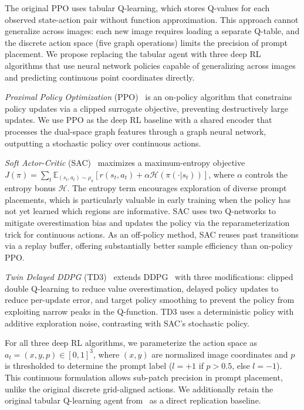 \documentclass[journal, onecolumn]{IEEEtran}
\begin{document}
The original PPO uses tabular Q-learning, which stores Q-values for each observed state-action pair without function approximation. This approach cannot generalize across images: each new image requires loading a separate Q-table, and the discrete action space (five graph operations) limits the precision of prompt placement. We propose replacing the tabular agent with three deep RL algorithms that use neural network policies capable of generalizing across images and predicting continuous point coordinates directly.

\textit{Proximal Policy Optimization} (PPO)~\cite{Schulman2017PPO} is an on-policy algorithm that constrains policy updates via a clipped surrogate objective, preventing destructively large updates. We use PPO as the deep RL baseline with a shared encoder that processes the dual-space graph features through a graph neural network, outputting a stochastic policy over continuous actions.

\textit{Soft Actor-Critic} (SAC)~\cite{Haarnoja2018SAC} maximizes a maximum-entropy objective $J(\pi) = \sum_t \mathbb{E}_{(s_t, a_t) \sim \rho_\pi}\left[r(s_t, a_t) + \alpha \mathcal{H}(\pi(\cdot | s_t))\right]$, where $\alpha$ controls the entropy bonus $\mathcal{H}$. The entropy term encourages exploration of diverse prompt placements, which is particularly valuable in early training when the policy has not yet learned which regions are informative. SAC uses two Q-networks to mitigate overestimation bias and updates the policy via the reparameterization trick for continuous actions. As an off-policy method, SAC reuses past transitions via a replay buffer, offering substantially better sample efficiency than on-policy PPO.

\textit{Twin Delayed DDPG} (TD3)~\cite{Fujimoto2018TD3} extends DDPG~\cite{Lillicrap2016DDPG} with three modifications: clipped double Q-learning to reduce value overestimation, delayed policy updates to reduce per-update error, and target policy smoothing to prevent the policy from exploiting narrow peaks in the Q-function. TD3 uses a deterministic policy with additive exploration noise, contrasting with SAC's stochastic policy.

For all three deep RL algorithms, we parameterize the action space as $a_t = (x, y, p) \in [0, 1]^3$, where $(x, y)$ are normalized image coordinates and $p$ is thresholded to determine the prompt label ($l = +1$ if $p > 0.5$, else $l = -1$). This continuous formulation allows sub-patch precision in prompt placement, unlike the original discrete grid-aligned actions. We additionally retain the original tabular Q-learning agent from~\cite{Liu2025PlugAndPlayPPO} as a direct replication baseline.
\end{document}
